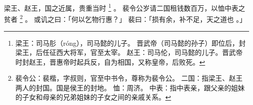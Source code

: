 
\switchcolumn*[\section{}]

梁王、赵王，国之近属，贵重当时%
\footnote{%
    梁王：司马肜（róng），司马懿的儿子。
          晋武帝（司马懿的孙子）即位后，封梁王，后任征西大将军，官至太宰。
    赵王：司马伦，司马懿的儿子。晋武帝时封赵王，晋惠帝时起兵反，自为相国，又称皇帝，后败死。
}%
。
裴令公岁请二国租钱数百万，以恤中表之贫者%
\footnote{%
    裴令公：裴楷，字叔则，官至中书令，尊称为裴令公。
    二国：指梁王、赵王两人的封国。国是侯王的封地。
    恤：周济。
    中表：指中表亲，跟父亲的姐妹的子女和母亲的兄弟姐妹的子女之间的亲戚关系。
}%
。
或讥之曰：「何以乞物行惠？」
裴曰：「损有余，补不足，天之道也 。」

\switchcolumn


